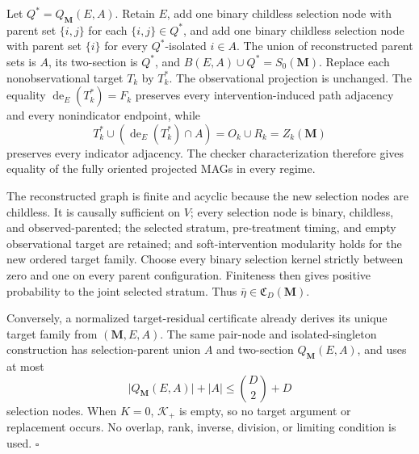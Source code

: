 Let \(Q^*=Q_{\mathbf M}(E,A)\).  Retain \(E\), add one binary childless selection node with parent set \(\{i,j\}\) for each \(\{i,j\}\in Q^*\), and add one binary childless selection node with parent set \(\{i\}\) for every \(Q^*\)-isolated \(i\in A\).  The union of reconstructed parent sets is \(A\), its two-section is \(Q^*\), and \(B(E,A)\cup Q^*=S_0(\mathbf M)\).  Replace each nonobservational target \(T_k\) by \(T_k^*\).  The observational projection is unchanged.  The equality \(\operatorname{de}_E(T_k^*)=F_k\) preserves every intervention-induced path adjacency and every nonindicator endpoint, while
\[
T_k^*\cup(\operatorname{de}_E(T_k^*)\cap A)
=O_k\cup R_k
=Z_k(\mathbf M)
\]
preserves every indicator adjacency.  The checker characterization therefore gives equality of the fully oriented projected MAGs in every regime.

The reconstructed graph is finite and acyclic because the new selection nodes are childless.  It is causally sufficient on \(V\); every selection node is binary, childless, and observed-parented; the selected stratum, pre-treatment timing, and empty observational target are retained; and soft-intervention modularity holds for the new ordered target family.  Choose every binary selection kernel strictly between zero and one on every parent configuration.  Finiteness then gives positive probability to the joint selected stratum.  Thus \(\bar\eta\in\mathfrak C_D(\mathbf M)\).

Conversely, a normalized target-residual certificate already derives its unique target family from \((\mathbf M,E,A)\).  The same pair-node and isolated-singleton construction has selection-parent union \(A\) and two-section \(Q_{\mathbf M}(E,A)\), and uses at most
\[
\lvert Q_{\mathbf M}(E,A)\rvert+\lvert A\rvert
\le \binom D2+D
\]
selection nodes.  When \(K=0\), \(\mathcal K_+\) is empty, so no target argument or replacement occurs.  No overlap, rank, inverse, division, or limiting condition is used. \(\square\)